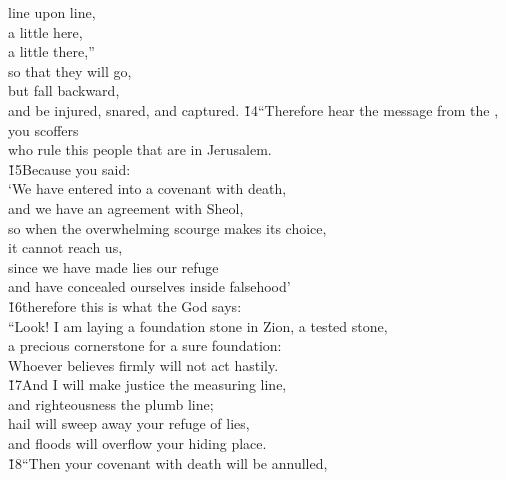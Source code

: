 \begin{poetry}
\poemlll       line upon line, \\
\poemll    a little here, \\
\poemlll       a little there,'' \\
\poeml so that they will go, \\
\poemll    but fall backward, \\
\poemlll       and be injured, snared, and captured.
\poeml \v{14}``Therefore hear the message from the , you scoffers \\
\poemll    who rule this people that are in Jerusalem. \\
\poeml \v{15}Because you said: \\
\poemll    `We have entered into a covenant with death, \\
\poemlll       and we have an agreement with Sheol, \\
\poemll    so when the overwhelming scourge makes its choice, \\
\poemlll       it cannot reach us, \\
\poemll    since we have made lies our refuge \\
\poemlll       and have concealed ourselves inside falsehood' \\
\poeml \v{16}therefore this is what the  God says: \\
\poemll    ``Look! I am laying a foundation stone in Zion, a tested stone, \\
\poemlll       a precious cornerstone for a sure foundation: \\
\poemll    Whoever believes firmly will not act hastily. \\
\poeml \v{17}And I will make justice the measuring line, \\
\poemll    and righteousness the plumb line; \\
\poeml hail will sweep away your refuge of lies, \\
\poemll    and floods will overflow your hiding place. \\
\poeml \v{18}``Then your covenant with death will be annulled, \\

\end{poetry}
